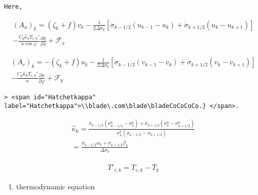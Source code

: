 \begin{verbatim}
Here,
\end{verbatim}

\begin{eqnarray}
  (A_u)_k
    =  ( \zeta_k + f ) v_k 
             - \frac{1}{2 \Delta \sigma_k} 
             [   \dot{\sigma}_{k-1/2} ( u_{k-1} - u_k   )
               + \dot{\sigma}_{k+1/2} ( u_k   - u_{k+1} ) ]
            \\
           - \frac{C_{p} \hat{\kappa}_k T_{v,k}'}{a\cos\varphi} 
                  \frac{\partial \pi}{\partial \lambda} 
             + {\mathcal F}_x
\end{eqnarray}

\begin{eqnarray}
  (A_v)_k
    =  - ( \zeta_k + f ) u_k 
             - \frac{1}{2 \Delta \sigma_k} 
             [   \dot{\sigma}_{k-1/2} ( v_{k-1} - v_k   )
               + \dot{\sigma}_{k+1/2} ( v_k   - v_{k+1} ) ]
            \\
           - \frac{C_{p} \hat{\kappa}_k T_{v,k}'}{a} 
               \frac{\partial \pi}{\partial \varphi} 
             + {\mathcal F}_y
\end{eqnarray}

\begin{verbatim}
> <span id="Hatchetkappa" label="Hatchetkappa">\\blade\.com\blade\bladeCoCoCoCo.} </span>.
\end{verbatim}

\begin{eqnarray}
   \hat{\kappa}_k 
    =       \frac{  \sigma_{k-1/2}(   \sigma^{\kappa}_{k-1/2} 
                                    - \sigma^{\kappa}_k      ) 
                  + \sigma_{k+1/2}(   \sigma^{\kappa}_k 
                                    - \sigma^{\kappa}_{k+1/2}  ) }
                 { \sigma^{\kappa}_k
                     ( \sigma_{k-1/2} - \sigma_{k+1/2} )         } 
            \\
  =  \frac{ \sigma_{k-1/2} \alpha_k + \sigma_{k+1/2} \beta_k }
            { \Delta \sigma_k                                  } 
\end{eqnarray}

\begin{eqnarray}
T'_{v,k} = T_{v,k} - \bar{T}_k
\end{eqnarray}

\begin{enumerate}
\def\labelenumi{\arabic{enumi}.}
\setcounter{enumi}{3}
\tightlist
\item
  thermodynamic equation
\end{enumerate}


